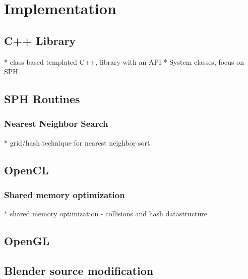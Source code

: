 \chapter{Implementation}

\section{C++ Library}
* class based templated C++, library with an API
* System classes, focus on SPH

\section{SPH Routines}
\subsection{Nearest Neighbor Search}
* grid/hash technique for nearest neighbor sort


\section{OpenCL}
\subsection{Shared memory optimization}
* shared memory optimization - collisions and hash datastructure 

\section{OpenGL}
\section{Blender source modification}



